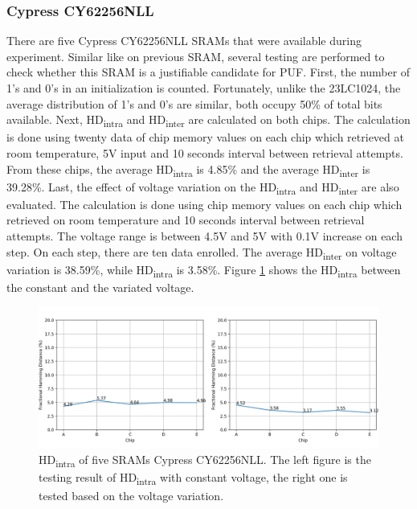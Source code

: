 \subsubsection{Cypress CY62256NLL}

There are five Cypress CY62256NLL SRAMs that were available during experiment. Similar like on previous SRAM, several testing are performed to check whether this SRAM is a justifiable candidate for PUF.
First, the number of 1's and 0's in an initialization is counted. Fortunately, unlike the 23LC1024, the average distribution of 1's and 0's are similar, both occupy 50\% of total bits available.
Next,
HD\textsubscript{intra} and HD\textsubscript{inter} are calculated on both chips. The calculation is done using twenty data of chip memory values on each chip which retrieved at room temperature, 5V input and 10 seconds interval between retrieval attempts.
From these chips, the average HD\textsubscript{intra} is 4.85\% and the average HD\textsubscript{inter} is 39.28\%.
Last, the effect of voltage variation on the HD\textsubscript{intra} and HD\textsubscript{inter} are also evaluated. The calculation is done using chip memory values on each chip which retrieved on room temperature and 10 seconds interval between retrieval attempts. The voltage range is between 4.5V and 5V with 0.1V increase on each step. On each step, there are ten data enrolled.
The average HD\textsubscript{inter} on voltage variation is 38.59\%, while HD\textsubscript{intra} is 3.58\%. Figure \ref{fig:cy62256nll_hd_intra} shows the HD\textsubscript{intra} between the constant and the variated voltage.

\begin{figure}[tph!]
    \centerline{\includegraphics[width={\textwidth}]{images/cy62256nll_hd_intra}}
    \caption{HD\textsubscript{intra} of five SRAMs Cypress CY62256NLL. The left figure is the testing result of HD\textsubscript{intra} with constant voltage, the right one is tested based on the voltage variation.}
    \label{fig:cy62256nll_hd_intra}
\end{figure}

